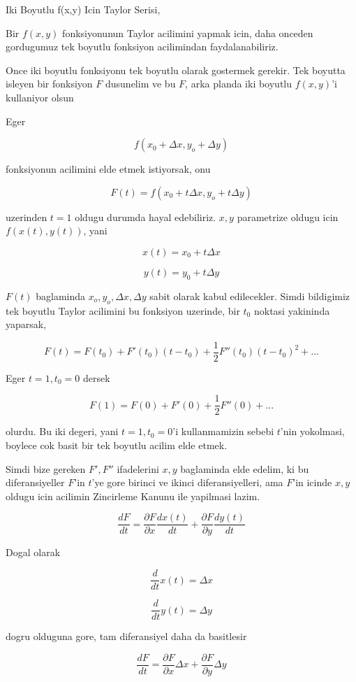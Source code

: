 \documentclass[12pt,fleqn]{article}
\begin{document}
Iki Boyutlu f(x,y) Icin Taylor Serisi, 

Bir $f(x,y)$ fonksiyonunun Taylor acilimini yapmak icin, daha onceden
gordugumuz tek boyutlu fonksiyon acilimindan faydalanabiliriz. 

Once iki boyutlu fonksiyonu tek boyutlu olarak gostermek gerekir. Tek
boyutta isleyen bir fonksiyon $F$ dusunelim ve bu $F$, arka planda iki
boyutlu $f(x,y)$'i kullaniyor olsun

Eger 

\[ f(x_0 +\Delta x, y_o + \Delta y) \]

fonksiyonun acilimini elde etmek istiyorsak, onu

\[ F(t) = f(x_0 + t\Delta x, y_o + t\Delta y) \]

uzerinden $t=1$ oldugu durumda hayal edebiliriz. $x,y$ parametrize 
oldugu icin  $f(x(t),y(t))$, yani

\[ x(t) = x_0 + t\Delta x \]

\[ y(t) = y_0 + t\Delta y \]

$F(t)$ baglaminda $x_o, y_o, \Delta x, \Delta y$ sabit olarak kabul edilecekler. Simdi bildigimiz
tek boyutlu Taylor acilimini bu fonksiyon uzerinde, bir $t_0$ noktasi yakininda 
yaparsak,

\[ F(t) = F(t_0) + F'(t_0)(t-t_0) + \frac{1}{2}F''(t_0)(t-t_0)^2 + ... \]

Eger $t=1,t_0=0$ dersek

\[ F(1) = F(0) + F'(0) + \frac{1}{2}F''(0) + ... \]

olurdu. Bu iki degeri, yani  $t=1,t_0=0$'i kullanmamizin sebebi $t$'nin
yokolmasi, boylece cok basit bir tek boyutlu acilim elde etmek. 

Simdi bize gereken $F',F''$ ifadelerini $x,y$ baglaminda elde edelim, ki bu
diferansiyeller $F$'in $t$'ye gore birinci ve ikinci diferansiyelleri, ama
$F$'in icinde $x,y$ oldugu icin acilimin Zincirleme Kanunu ile yapilmasi
lazim.

\[ \frac{dF}{dt} = \frac{\partial F}{\partial x}\frac{dx(t)}{dt} +
\frac{\partial F}{\partial y}\frac{dy(t)}{dt} 
 \]

Dogal olarak 

\[ \frac{d}{dt}x(t) = \Delta x \]

\[ \frac{d}{dt}y(t) = \Delta y \]

dogru olduguna gore, tam diferansiyel daha da basitlesir

\[ \frac{dF}{dt} = \frac{\partial F}{\partial x}\Delta x +
\frac{\partial F}{\partial y}\Delta y
 \]
\end{document}
